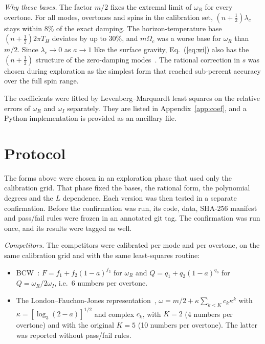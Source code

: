 \documentclass[prd,twocolumn,superscriptaddress,nofootinbib]{revtex4-2}
\begin{document}
\textit{Why these bases.} The factor $m/2$ fixes the extremal limit of $\omega_R$ for every overtone. For all modes,
overtones and spins in the calibration set, $(n+\tfrac12)\lambda_c$ stays within $8\%$ of the exact damping. The
horizon-temperature base $(n+\tfrac12)2\pi T_H$ deviates by up to $30\%$, and $m\Omega_c$ was a worse base for
$\omega_R$ than $m/2$. Since $\lambda_c\to0$ as $a\to1$ like the surface gravity, Eq.~(\ref{eq:wi}) also has the
$(n+\tfrac12)$ structure of the zero-damping modes~\cite{Hod:2008zz,Yang:2012pj,Cook:2014cta}. The rational
correction in $s$ was chosen during exploration as the simplest form that reached sub-percent accuracy over the full
spin range.

The coefficients were fitted by Levenberg--Marquardt least squares on the relative errors of $\omega_R$ and $\omega_I$
separately. They are listed in Appendix~\ref{app:coef}, and a Python implementation is provided as an ancillary file.

\section{Protocol}

The forms above were chosen in an exploration phase that used only the calibration grid. That phase fixed the
bases, the rational form, the polynomial degrees and the $L$ dependence. Each version was then tested in a separate
confirmation. Before the confirmation was run, its code, data, SHA-256 manifest and pass/fail rules were frozen in an
annotated git tag. The confirmation was run once, and its results were tagged as well.

\textit{Competitors.} The competitors were calibrated per mode and per overtone, on the same calibration grid and with
the same least-squares routine:
\begin{itemize}
\item BCW~\cite{Berti:2005ys}: $F=f_1+f_2(1-a)^{f_3}$ for $\omega_R$ and $Q=q_1+q_2(1-a)^{q_3}$ for
$Q=\omega_R/2\omega_I$, i.e.\ 6 numbers per overtone.
\item The London--Fauchon-Jones representation~\cite{London:2018nxs},
$\omega=m/2+\kappa\sum_{k<K}c_k\kappa^k$ with $\kappa=[\log_3(2-a)]^{1/2}$ and complex $c_k$, with $K=2$ (4 numbers
per overtone) and with the original $K=5$ (10 numbers per overtone). The latter was reported without pass/fail rules.
\end{itemize}
\end{document}
